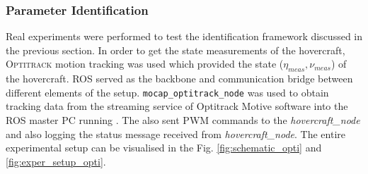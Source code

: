 \documentclass[12pt,titlepage]{article}
\begin{document}
\subsubsection{Parameter Identification}
Real experiments were performed to test the identification framework discussed in the previous section. In order to get the state measurements of the hovercraft, \textsc{Optitrack} motion tracking was used which provided the state ($\eta_{meas}, \nu_{meas}$) of the hovercraft. ROS served as the backbone and communication bridge between different elements of the setup. \texttt{mocap\_optitrack\_node} was used to obtain tracking data from the streaming service of Optitrack Motive software into the ROS master PC running . The  also sent PWM commands to the \textit{hovercraft\_node} and also logging the status message received from \textit{hovercraft\_node}. The entire experimental setup can be visualised in the Fig. \ref{fig:schematic_opti} and \ref{fig:exper_setup_opti}.
\end{document}
